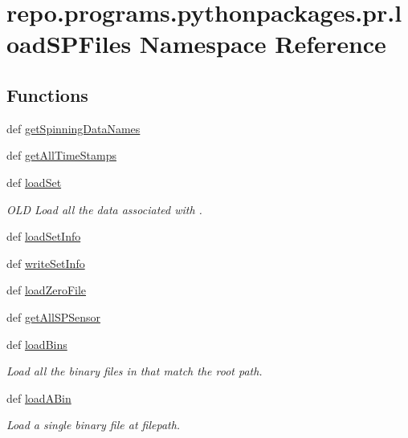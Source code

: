 \hypertarget{namespacerepo_1_1programs_1_1pythonpackages_1_1pr_1_1loadSPFiles}{\section{repo.\-programs.\-pythonpackages.\-pr.\-load\-S\-P\-Files Namespace Reference}
\label{namespacerepo_1_1programs_1_1pythonpackages_1_1pr_1_1loadSPFiles}
}
\subsection*{Functions}
\begin{DoxyCompactItemize}
\item 
def \hyperlink{namespacerepo_1_1programs_1_1pythonpackages_1_1pr_1_1loadSPFiles_ad67a85b681c64920ca3d127dcbb8693a}{get\-Spinning\-Data\-Names}
\item 
def \hyperlink{namespacerepo_1_1programs_1_1pythonpackages_1_1pr_1_1loadSPFiles_a1a641072729c4056f58d2f36926b21d1}{get\-All\-Time\-Stamps}
\item 
def \hyperlink{namespacerepo_1_1programs_1_1pythonpackages_1_1pr_1_1loadSPFiles_ac05316301b88456778eaedde597c8ed5}{load\-Set}
\begin{DoxyCompactList}\small\item\em O\-L\-D Load all the data associated with . \end{DoxyCompactList}\item 
def \hyperlink{namespacerepo_1_1programs_1_1pythonpackages_1_1pr_1_1loadSPFiles_a94905f8c986f1a826f5e14c6c271d3bc}{load\-Set\-Info}
\item 
def \hyperlink{namespacerepo_1_1programs_1_1pythonpackages_1_1pr_1_1loadSPFiles_a7a17d807e31989fac9962e7eb5fa3de5}{write\-Set\-Info}
\item 
def \hyperlink{namespacerepo_1_1programs_1_1pythonpackages_1_1pr_1_1loadSPFiles_aa6876f5f9096cba233794dd03f719de3}{load\-Zero\-File}
\item 
def \hyperlink{namespacerepo_1_1programs_1_1pythonpackages_1_1pr_1_1loadSPFiles_ad96607a97fb1364b1b8f5a96a6537818}{get\-All\-S\-P\-Sensor}
\item 
def \hyperlink{namespacerepo_1_1programs_1_1pythonpackages_1_1pr_1_1loadSPFiles_af4f5d276f8094f09b7f23a7e43031b4b}{load\-Bins}
\begin{DoxyCompactList}\small\item\em Load all the binary files in that match the root path. \end{DoxyCompactList}\item 
def \hyperlink{namespacerepo_1_1programs_1_1pythonpackages_1_1pr_1_1loadSPFiles_a48f328dcf32e16ad58677599d39be6a1}{load\-A\-Bin}
\begin{DoxyCompactList}\small\item\em Load a single binary file at filepath. \end{DoxyCompactList}\end{DoxyCompactItemize}
